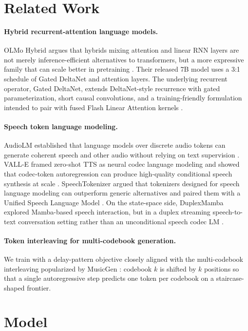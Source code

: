 \documentclass[11pt]{article}
\begin{document}
\section{Related Work}
\paragraph{Hybrid recurrent-attention language models.}
OLMo Hybrid argues that hybrids mixing attention and linear RNN layers are not merely inference-efficient alternatives to transformers, but a more expressive family that can scale better in pretraining \citep{merrill2026olmohybrid}. Their released 7B model uses a 3:1 schedule of Gated DeltaNet and attention layers. The underlying recurrent operator, Gated DeltaNet, extends DeltaNet-style recurrence with gated parameterization, short causal convolutions, and a training-friendly formulation intended to pair with fused Flash Linear Attention kernels \citep{yang2024gateddeltanet}.

\paragraph{Speech token language modeling.}
AudioLM established that language models over discrete audio tokens can generate coherent speech and other audio without relying on text supervision \citep{borsos2022audiolm}. VALL-E framed zero-shot TTS as neural codec language modeling and showed that codec-token autoregression can produce high-quality conditional speech synthesis at scale \citep{wang2023valle}. SpeechTokenizer argued that tokenizers designed for speech language modeling can outperform generic alternatives and paired them with a Unified Speech Language Model \citep{zhang2023speechtokenizer}. On the state-space side, DuplexMamba explored Mamba-based speech interaction, but in a duplex streaming speech-to-text conversation setting rather than an unconditional speech codec LM \citep{lu2025duplexmamba}.

\paragraph{Token interleaving for multi-codebook generation.}
We train with a delay-pattern objective closely aligned with the multi-codebook interleaving popularized by MusicGen \citep{copet2023simple}: codebook $k$ is shifted by $k$ positions so that a single autoregressive step predicts one token per codebook on a staircase-shaped frontier.

\section{Model}
\end{document}
